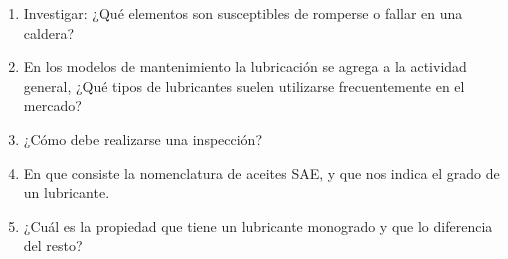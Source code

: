 \documentclass[../main]{subfiles}
\begin{document}
\begin{enumerate}
\begin{enumerate}
  \end{enumerate}
    
    \item Investigar: ¿Qué elementos son susceptibles de romperse o fallar en una caldera?
    \item En los modelos de mantenimiento la lubricación se agrega a la actividad general, ¿Qué tipos de lubricantes suelen utilizarse frecuentemente en el mercado? 
    \item ¿Cómo debe realizarse una inspección?
    \item  En que consiste la nomenclatura de aceites SAE, y que nos indica el grado de un lubricante.
    \item ¿Cuál es la propiedad que tiene un lubricante monogrado y que lo diferencia del resto?
    
    
\end{enumerate}
\end{document}
